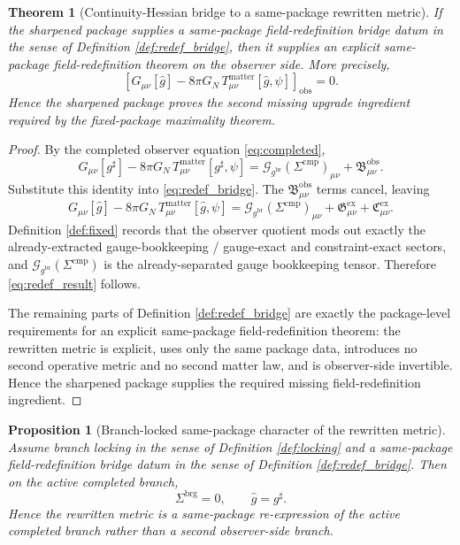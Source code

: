 \documentclass[11pt]{article}
\newcommand{\ObserverMetric}{g^{\mathrm{br}}}
\newcommand{\CompletedMetric}{g^{\sharp}}
\newcommand{\RedefMetric}{\widehat g}
\newcommand{\CompShift}{\Sigma^{\mathrm{cmp}}}
\newcommand{\BridgeShift}{\Sigma^{\mathrm{brg}}}
\newcommand{\GaugeBook}{\mathcal G_{\ObserverMetric}}
\newcommand{\ObsBurden}{\mathfrak B_{\mu\nu}^{\mathrm{obs}}}
\newcommand{\ObserverClass}[1]{\left[#1\right]_{\mathrm{obs}}}
\newcommand{\GaugeExact}{\mathfrak G_{\mu\nu}^{\mathrm{ex}}}
\newcommand{\ConstraintExact}{\mathfrak C_{\mu\nu}^{\mathrm{ex}}}
\newtheorem{proposition}{Proposition}
\newtheorem{theorem}{Theorem}
\begin{document}
\begin{theorem}[Continuity-Hessian bridge to a same-package rewritten metric]
\label{thm:redef}
If the sharpened package supplies a same-package field-redefinition bridge datum in the sense of Definition \ref{def:redef_bridge}, then it supplies an explicit same-package field-redefinition theorem on the observer side. More precisely,
\begin{equation}
\ObserverClass{
G_{\mu\nu}[\RedefMetric]
-8\pi G_N\,T_{\mu\nu}^{\mathrm{matter}}[\RedefMetric,\psi]
}=0.
\label{eq:redef_result}
\end{equation}
Hence the sharpened package proves the second missing upgrade ingredient required by the fixed-package maximality theorem.
\end{theorem}

\begin{proof}
By the completed observer equation \eqref{eq:completed},
\[
G_{\mu\nu}[\CompletedMetric]
-8\pi G_N\,T_{\mu\nu}^{\mathrm{matter}}[\CompletedMetric,\psi]
=
\GaugeBook(\CompShift)_{\mu\nu}+\ObsBurden.
\]
Substitute this identity into \eqref{eq:redef_bridge}. The \(\ObsBurden\) terms cancel, leaving
\[
G_{\mu\nu}[\RedefMetric]
-8\pi G_N\,T_{\mu\nu}^{\mathrm{matter}}[\RedefMetric,\psi]
=
\GaugeBook(\CompShift)_{\mu\nu}
+\GaugeExact+\ConstraintExact.
\]
Definition \ref{def:fixed} records that the observer quotient mods out exactly the already-extracted gauge-bookkeeping / gauge-exact and constraint-exact sectors, and \(\GaugeBook(\CompShift)\) is the already-separated gauge bookkeeping tensor. Therefore \eqref{eq:redef_result} follows.

The remaining parts of Definition \ref{def:redef_bridge} are exactly the package-level requirements for an explicit same-package field-redefinition theorem: the rewritten metric is explicit, uses only the same package data, introduces no second operative metric and no second matter law, and is observer-side invertible. Hence the sharpened package supplies the required missing field-redefinition ingredient.
\end{proof}

\begin{proposition}[Branch-locked same-package character of the rewritten metric]
\label{prop:redef_lock}
Assume branch locking in the sense of Definition \ref{def:locking} and a same-package field-redefinition bridge datum in the sense of Definition \ref{def:redef_bridge}. Then on the active completed branch,
\[
\BridgeShift=0,
\qquad
\RedefMetric=\CompletedMetric.
\]
Hence the rewritten metric is a same-package re-expression of the active completed branch rather than a second observer-side branch.
\end{proposition}
\end{document}
